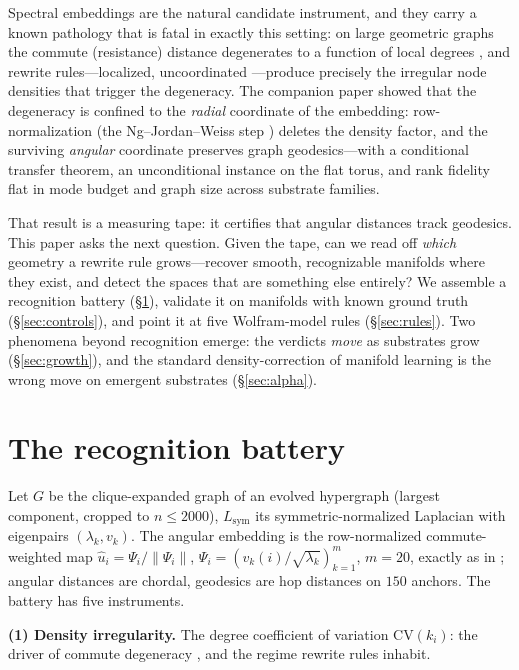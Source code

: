 \documentclass[11pt]{article}
\begin{document}
Spectral embeddings are the natural candidate instrument, and they carry a
known pathology that is fatal in exactly this setting: on large geometric
graphs the commute (resistance) distance degenerates to a function of local
degrees \cite{vonluxburg2014}, and rewrite rules---localized, uncoordinated
---produce precisely the irregular node densities that trigger the
degeneracy. The companion paper \cite{kta} showed that the degeneracy is
confined to the \emph{radial} coordinate of the embedding: row-normalization
(the Ng--Jordan--Weiss step \cite{ng2002}) deletes the density factor, and the
surviving \emph{angular} coordinate preserves graph geodesics---with a
conditional transfer theorem, an unconditional instance on the flat torus, and
rank fidelity flat in mode budget and graph size across substrate families.

That result is a measuring tape: it certifies that angular distances track
geodesics. This paper asks the next question. Given the tape, can we read off
\emph{which} geometry a rewrite rule grows---recover smooth, recognizable
manifolds where they exist, and detect the spaces that are something else
entirely? We assemble a recognition battery (\S\ref{sec:battery}), validate it
on manifolds with known ground truth (\S\ref{sec:controls}), and point it at
five Wolfram-model rules (\S\ref{sec:rules}). Two phenomena beyond
recognition emerge: the verdicts \emph{move} as substrates grow
(\S\ref{sec:growth}), and the standard density-correction of manifold
learning is the wrong move on emergent substrates (\S\ref{sec:alpha}).

\section{The recognition battery}\label{sec:battery}
Let $G$ be the clique-expanded graph of an evolved hypergraph (largest
component, cropped to $n\le2000$), $L_{\mathrm{sym}}$ its symmetric-normalized
Laplacian with eigenpairs $(\lambda_k,v_k)$. The angular embedding is the
row-normalized commute-weighted map
$\hat u_i=\Psi_i/\lVert\Psi_i\rVert$,
$\Psi_i=(v_k(i)/\sqrt{\lambda_k})_{k=1}^{m}$, $m=20$, exactly as in
\cite{kta}; angular distances are chordal, geodesics are hop distances on
$150$ anchors. The battery has five instruments.

\textbf{(1) Density irregularity.} The degree coefficient of variation
$\mathrm{CV}(k_i)$: the driver of commute degeneracy \cite{vonluxburg2014},
and the regime rewrite rules inhabit.
\end{document}
